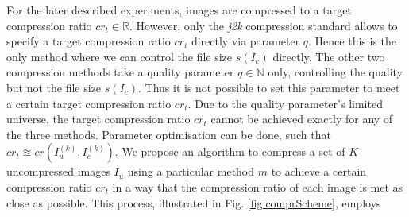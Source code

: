 \documentclass[10pt,twocolumn,letterpaper]{article}
\begin{document}
For the later described experiments, images are compressed to a target compression ratio $cr_t \in \mathbb{R}$. However, only the \emph{j2k} compression standard allows to specify a target compression ratio $cr_t$ directly via parameter $q$. Hence this is the only method where we can control the file size $s(I_c)$ directly. The other two compression methods take a quality parameter $q \in \mathbb{N}$ only, controlling the quality but not the file size $s(I_c)$. Thus it is not possible to set this parameter to meet a certain target compression ratio $cr_t$. Due to the quality parameter's limited universe, the target compression ratio $cr_t$ cannot be achieved exactly for any of the three methods. Parameter optimisation can be done, such that $cr_t \approxeq cr(I_u^{(k)}, I_c^{(k)})$. We propose an algorithm to compress a set of $K$ uncompressed images $I_u$ using a particular method $m$ to achieve a certain compression ratio $cr_t$ in a way that the compression ratio of each image is met as close as possible. 
This process, illustrated in Fig. \ref{fig:comprScheme}, employs
\end{document}
